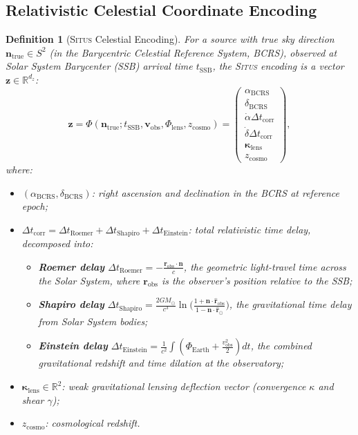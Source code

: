 \documentclass[11pt,a4paper]{article}
\newtheorem{definition}[theorem]{Definition}
\theoremstyle{definition}
\newcommand{\Situs}{\textsc{Situs}}
\newcommand{\R}{\mathbb{R}}
\begin{document}
\subsection{Relativistic Celestial Coordinate Encoding}
\begin{definition}[\Situs{} Celestial Encoding]\label{def:situs_celestial}
For a source with true sky direction $\mathbf{n}_{\mathrm{true}} \in S^2$ (in the Barycentric Celestial Reference System, BCRS), observed at Solar System Barycenter (SSB) arrival time $t_{\mathrm{SSB}}$, the \Situs{} encoding is a vector $\mathbf{z} \in \R^{d_z}$:
\begin{equation}\label{eq:situs_celestial}
\mathbf{z} = \Phi(\mathbf{n}_{\mathrm{true}}; t_{\mathrm{SSB}}, \mathbf{v}_{\mathrm{obs}}, \Phi_{\mathrm{lens}}, z_{\mathrm{cosmo}}) = 
\begin{pmatrix}
\alpha_{\mathrm{BCRS}} \\ \delta_{\mathrm{BCRS}} \\ \dot{\alpha} \Delta t_{\mathrm{corr}} \\ \dot{\delta} \Delta t_{\mathrm{corr}} \\ \boldsymbol{\kappa}_{\mathrm{lens}} \\ z_{\mathrm{cosmo}}
\end{pmatrix},
\end{equation}
where:
\begin{itemize}
    \item $(\alpha_{\mathrm{BCRS}}, \delta_{\mathrm{BCRS}})$: right ascension and declination in the BCRS at reference epoch;
    \item $\Delta t_{\mathrm{corr}} = \Delta t_{\mathrm{Roemer}} + \Delta t_{\mathrm{Shapiro}} + \Delta t_{\mathrm{Einstein}}$: total relativistic time delay, decomposed into:
        \begin{itemize}
            \item \textbf{Roemer delay} $\Delta t_{\mathrm{Roemer}} = -\frac{\mathbf{r}_{\mathrm{obs}} \cdot \mathbf{n}}{c}$, the geometric light-travel time across the Solar System, where $\mathbf{r}_{\mathrm{obs}}$ is the observer's position relative to the SSB;
            \item \textbf{Shapiro delay} $\Delta t_{\mathrm{Shapiro}} = \frac{2GM_\odot}{c^3} \ln\!\bigl(\frac{1 + \mathbf{n} \cdot \hat{\mathbf{r}}_{\mathrm{obs}}}{1 - \mathbf{n} \cdot \hat{\mathbf{r}}_{\odot}}\bigr)$, the gravitational time delay from Solar System bodies;
            \item \textbf{Einstein delay} $\Delta t_{\mathrm{Einstein}} = \frac{1}{c^2} \int (\Phi_{\mathrm{Earth}} + \frac{v_{\mathrm{obs}}^2}{2}) dt$, the combined gravitational redshift and time dilation at the observatory;
        \end{itemize}
    \item $\boldsymbol{\kappa}_{\mathrm{lens}} \in \R^2$: weak gravitational lensing deflection vector (convergence $\kappa$ and shear $\gamma$);
    \item $z_{\mathrm{cosmo}}$: cosmological redshift.
\end{itemize}
\end{definition}
\end{document}
